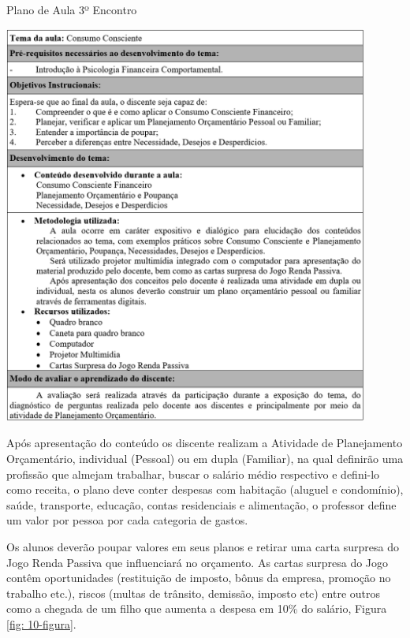\graphicspath{{quadros/}} 
\begin{quadro}[!ht]
\centering
\begin{minipage}{1.\textwidth}
\caption{Plano de Aula 3º Encontro}
\centering
\includegraphics[width=0.9\textwidth]{quadro-7_plano-aula-3}
\label{quad: quadro07}
\end{minipage}
\end{quadro}

Após apresentação do conteúdo os discente realizam a Atividade de Planejamento Orçamentário, individual (Pessoal) ou em dupla (Familiar), na qual definirão uma profissão que almejam trabalhar, buscar o salário médio respectivo e defini-lo como receita, o plano deve conter despesas com habitação (aluguel e condomínio), saúde, transporte, educação, contas residenciais e alimentação, o professor define um valor por pessoa por cada categoria de gastos.

Os alunos deverão poupar valores em seus planos e retirar uma carta surpresa do Jogo Renda Passiva que influenciará no orçamento. As cartas surpresa do Jogo contêm oportunidades (restituição de imposto, bônus da empresa, promoção no trabalho etc.), riscos (multas de trânsito, demissão, imposto etc) entre outros como a chegada de um filho que aumenta a despesa em 10\% do salário, Figura \ref{fig: 10-figura}.

